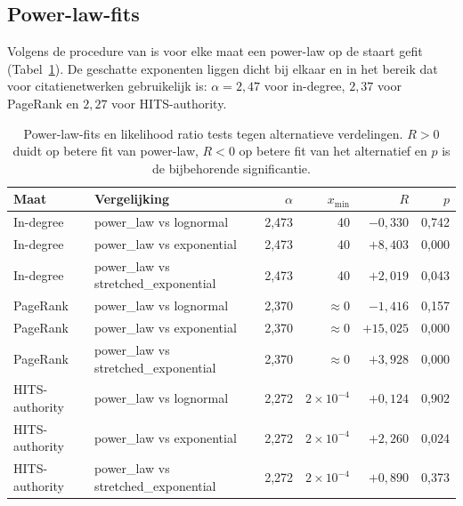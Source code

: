 \documentclass[a4paper, 12pt]{report}
\begin{document}
\subsection{Power-law-fits} 
Volgens de procedure van \textcite{clauset2009} is voor elke maat een power-law op de staart gefit (Tabel~\ref{tab:dv2-powerlaw}). De geschatte exponenten liggen dicht bij elkaar en in het bereik dat voor citatienetwerken gebruikelijk is: $\alpha = 2{,}47$ voor in-degree, $2{,}37$ voor PageRank en $2{,}27$ voor HITS-authority.
 

\begin{table}[H]
  \centering
  \caption{Power-law-fits \parencite{clauset2009} en likelihood ratio tests tegen alternatieve verdelingen. $R>0$ duidt op betere fit van power-law, $R<0$ op betere fit van het alternatief en $p$ is de bijbehorende significantie.}
  \label{tab:dv2-powerlaw}
  \footnotesize
  \begin{tabular}{llrrrr}
    \toprule
    Maat & Vergelijking & $\alpha$ & $x_{\min}$ & $R$ & $p$ \\
    \midrule
    In-degree & power\_law vs lognormal             & 2,473 & 40 & $-0{,}330$ & 0,742 \\
    In-degree & power\_law vs exponential           & 2,473 & 40 & $+8{,}403$ & 0,000 \\
    In-degree & power\_law vs stretched\_exponential & 2,473 & 40 & $+2{,}019$ & 0,043 \\
    \midrule
    PageRank & power\_law vs lognormal             & 2,370 & $\approx 0$ & $-1{,}416$ & 0,157 \\
    PageRank & power\_law vs exponential           & 2,370 & $\approx 0$ & $+15{,}025$ & 0,000 \\
    PageRank & power\_law vs stretched\_exponential & 2,370 & $\approx 0$ & $+3{,}928$ & 0,000 \\
    \midrule
    HITS-authority & power\_law vs lognormal             & 2,272 & $2\times10^{-4}$ & $+0{,}124$ & 0,902 \\
    HITS-authority & power\_law vs exponential           & 2,272 & $2\times10^{-4}$ & $+2{,}260$ & 0,024 \\
    HITS-authority & power\_law vs stretched\_exponential & 2,272 & $2\times10^{-4}$ & $+0{,}890$ & 0,373 \\
    \bottomrule
  \end{tabular}
\end{table}
\end{document}
